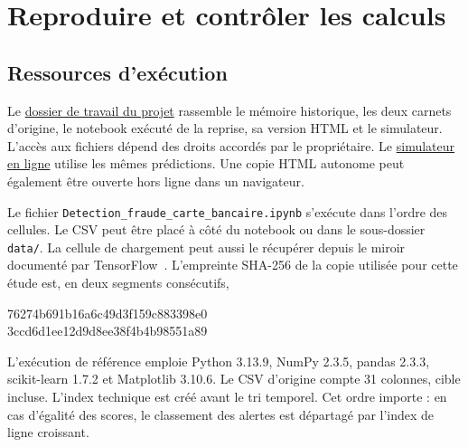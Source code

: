 \documentclass[11pt,a4paper]{article}
\begin{document}
\section{Reproduire et contrôler les calculs}\label{sec:annexe}

\subsection{Ressources d'exécution}
Le \href{https://drive.google.com/drive/folders/1Weoy-XsUsNgidqnBEDJ7QhyO2F6-zl3Q}{dossier de travail du projet} rassemble le mémoire historique, les deux carnets d'origine, le notebook exécuté de la reprise, sa version HTML et le simulateur. L'accès aux fichiers dépend des droits accordés par le propriétaire. Le \href{https://aymen-data.github.io/credit-card-fraud-portfolio/}{simulateur en ligne} utilise les mêmes prédictions. Une copie HTML autonome peut également être ouverte hors ligne dans un navigateur.

Le fichier \texttt{Detection\_fraude\_carte\_bancaire.ipynb} s'exécute dans l'ordre des cellules. Le CSV peut être placé à côté du notebook ou dans le sous-dossier \texttt{data/}. La cellule de chargement peut aussi le récupérer depuis le miroir documenté par TensorFlow~\cite{tensorflow}. L'empreinte SHA-256 de la copie utilisée pour cette étude est, en deux segments consécutifs,
\begin{center}\small\ttfamily
76274b691b16a6c49d3f159c883398e0\\
3ccd6d1ee12d9d8ee38f4b4b98551a89
\end{center}

L'exécution de référence emploie Python 3.13.9, NumPy 2.3.5, pandas 2.3.3, scikit-learn 1.7.2 et Matplotlib 3.10.6. Le CSV d'origine compte 31 colonnes, cible incluse. L'index technique est créé avant le tri temporel. Cet ordre importe : en cas d'égalité des scores, le classement des alertes est départagé par l'index de ligne croissant.
\end{document}
